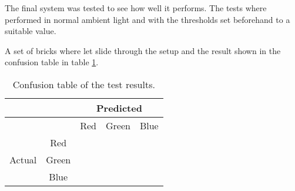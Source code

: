 The final system was tested to see how well it performs.
The tests where performed in normal ambient light and with the thresholds set beforehand to a suitable value.

A set of bricks where let slide through the setup and the result shown in the confusion table in table \ref{tab:confusiontable_testresults}.


\begin{table}[H]
\centering
\begin{tabular}{|c|c|c|c|c|}
\hline
 & &  \multicolumn{3}{|c|}{Predicted} \\ \hline
 & & Red & Green & Blue \\ \cline{1-5} 
\multirow{3}{*}{Actual} & Red & & & \\ \cline{2-5}
 & Green & & & \\ \cline{2-5}
 & Blue & & & \\ \hline
\end{tabular}
\caption{Confusion table of the test results.}
\label{tab:confusiontable_testresults}
\end{table}